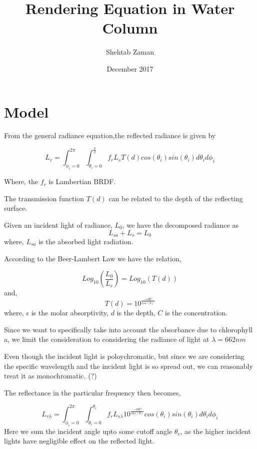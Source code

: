 \documentclass{article}
\title{Rendering Equation in Water Column}
\author{Shehtab Zaman }
\date{December 2017}
\begin{document}

\maketitle
\section{Model}

From the general radiance equation,the reflected radiance is given by

\begin{equation}
  L_r = \int^{2\pi}_{\phi_i = 0}\int^{\frac{\pi}{2}}_{\theta_i = 0}
  f_r L_s T(d)cos(\theta_i)sin(\theta_i)d\theta_i d\phi_i
\end{equation}

Where, the $ f_r$ is Lambertian BRDF.

The transmission function $T(d)$ can be related to the depth of the reflecting
surface.

Given an incident light of radiance, $L_0$,
we have the decomposed radiance as
$$L_{sa} + L_{s} = L_0$$
where, $ L_{sa}$ is the absorbed light radiation.



According to the Beer-Lambert Law we have the relation,

\begin{equation}
  Log_{10}\left(\frac{L_0}{L_{s}}\right) = Log_{10}(T(d))
\end{equation}
and,
\begin{equation}
  T(d) = 10^\frac{-\epsilon d C}{cos(\theta)}
\end{equation}
where, $\epsilon$ is the molar absorptivity, $ d$ is the depth, $ C$ is the concentration.

Since we want to specifically take into account the
absorbance due to chlorophyll a, we limit the consideration
to considering the radiance of light at $\lambda = 662nm$

Even though the incident light is poloychromatic, but since we are considering the specific wavelength
and the incident light is so spread out, we can reasonably treat it as monochromatic. (?)

The reflectance in the particular frequency then becomes,

\begin{equation}
  L_{r \lambda} = \int^{2\pi}_{\phi_i = 0}\int^{\theta_c}_{\theta_i = 0}
  f_r L_{s\lambda} 10^\frac{-\epsilon d C}{cos(\theta)}cos(\theta_i)sin(\theta_i)d\theta_i d\phi_i
\end{equation}
Here we sum the incident angle upto some cutoff angle $\theta_c$, as the higher incident lights
have negligible effect on the reflected light.
\end{document}
